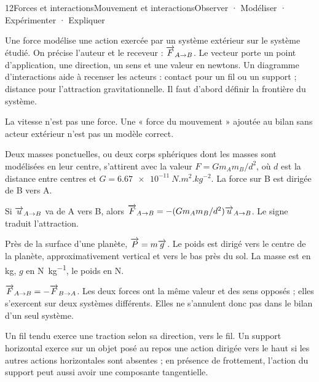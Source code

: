 \begin{ouverture}[newton]{12}{Forces et interactions}{Mouvement et interactions}{Observer · Modéliser · Expérimenter · Expliquer}
\end{ouverture}
\essentiel
{}
Une force modélise une action exercée par un système extérieur sur le système étudié. On précise l'auteur et le receveur : $\overrightarrow{F}_{A\to B}$. Le vecteur porte un point d'application, une direction, un sens et une valeur en newtons.
Un diagramme d'interactions aide à recenser les acteurs : contact pour un fil ou un support ; distance pour l'attraction gravitationnelle. Il faut d'abord définir la frontière du système.
\begin{attention}La vitesse n'est pas une force. Une « force du mouvement » ajoutée au bilan sans acteur extérieur n'est pas un modèle correct.\end{attention}
\begin{loi}[Gravitation]Deux masses ponctuelles, ou deux corps sphériques dont les masses sont modélisées en leur centre, s'attirent avec la valeur $F=Gm_Am_B/d^2$, où $d$ est la distance entre centres et $G=\qty{6,67e-11}{N.m^2.kg^{-2}}$. La force sur B est dirigée de B vers A.\end{loi}
Si $\overrightarrow{u}_{A\to B}$ va de A vers B, alors $\overrightarrow{F}_{A\to B}=-(Gm_Am_B/d^2)\overrightarrow{u}_{A\to B}$. Le signe traduit l'attraction.
\begin{definition}[Poids]Près de la surface d'une planète, $\overrightarrow{P}=m\overrightarrow{g}$. Le poids est dirigé vers le centre de la planète, approximativement vertical et vers le bas près du sol. La masse est en kg, $g$ en \unit{N.kg^{-1}}, le poids en N.\end{definition}
\begin{loi}$\overrightarrow{F}_{A\to B}=-\overrightarrow{F}_{B\to A}$. Les deux forces ont la même valeur et des sens opposés ; elles s'exercent sur deux systèmes différents. Elles ne s'annulent donc pas dans le bilan d'un seul système.\end{loi}
Un fil tendu exerce une traction selon sa direction, vers le fil. Un support horizontal exerce sur un objet posé au repos une action dirigée vers le haut si les autres actions horizontales sont absentes ; en présence de frottement, l'action du support peut aussi avoir une composante tangentielle.
